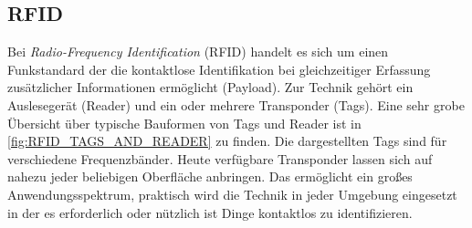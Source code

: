 \subsection{RFID}
%
Bei \textit{Radio-Frequency Identification} (RFID) handelt es sich um einen Funkstandard der die kontaktlose Identifikation bei gleichzeitiger Erfassung zusätzlicher Informationen ermöglicht (Payload). Zur Technik gehört ein Auslesegerät (Reader) und ein oder mehrere Transponder (Tags). Eine sehr grobe Übersicht über typische Bauformen von Tags und Reader ist in \ref{fig:RFID_TAGS_AND_READER} zu finden. Die dargestellten Tags sind für verschiedene Frequenzbänder. Heute verfügbare Transponder lassen sich auf nahezu jeder beliebigen Oberfläche anbringen. Das ermöglicht ein großes Anwendungsspektrum, praktisch wird die Technik in jeder Umgebung eingesetzt in der es erforderlich oder nützlich ist Dinge kontaktlos zu identifizieren. \\

